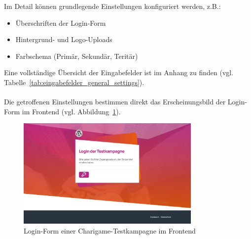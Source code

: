Im Detail können grundlegende Einstellungen konfiguriert werden, z.B.:
\begin{itemize}
\item Überschriften der Login-Form
\item Hintergrund- und Logo-Uploads
\item Farbschema (Primär, Sekundär, Teritär)
\end{itemize}
Eine vollständige Übersicht der Eingabefelder ist im Anhang zu finden (vgl. Tabelle~\ref{tab:eingabefelder_general_settings}).
\\\\
Die getroffenen Einstellungen bestimmen direkt das Erscheinungsbild der Login-Form im Frontend (vgl. Abbildung~\ref{fig:login-textkampagne}).

\begin{figure}[H]
    \centering
    \includegraphics[width=0.8\textwidth]{images/legacy_login_testkampagne}
    \caption{Login-Form einer Charigame-Testkampagne im Frontend}
    \label{fig:login-textkampagne}
\end{figure}

